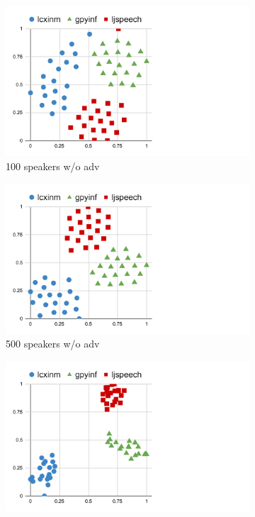 \begin{figure}[!ht]
    \centering
    \begin{minipage}[b]{0.9\linewidth}
        \centering
        \begin{subfigure}[b]{0.3\linewidth}
            \centering
            \includegraphics[width=\linewidth,trim=0 0 200 0,clip]{figure/5_dvector11.pdf}
            \caption{100 speakers w/o adv}
        \end{subfigure}        
        \begin{subfigure}[b]{0.3\linewidth}
            \centering
            \includegraphics[width=\linewidth,trim=0 0 200 0,clip]{figure/5_dvector12.pdf}
            \caption{500 speakers w/o adv}
        \end{subfigure}   
        \begin{subfigure}[b]{0.3\linewidth}
            \centering
            \includegraphics[width=\linewidth,trim=0 0 200 0,clip]{figure/5_dvector13.pdf}

\end{subfigure}
\end{minipage}
\end{figure}
